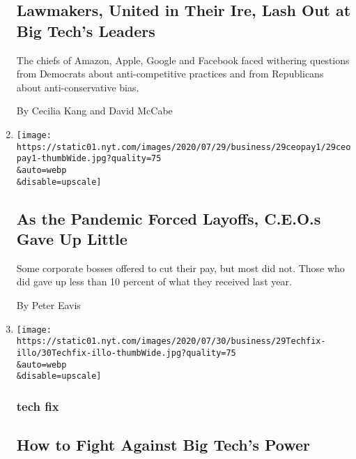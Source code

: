 \begin{enumerate}
  \hypertarget{lawmakers-united-in-their-ire-lash-out-at-big-techs-leaders}{%
  \subsection{Lawmakers, United in Their Ire, Lash Out at Big Tech's
  Leaders}\label{lawmakers-united-in-their-ire-lash-out-at-big-techs-leaders}}

  The chiefs of Amazon, Apple, Google and Facebook faced withering
  questions from Democrats about anti-competitive practices and from
  Republicans about anti-conservative bias.

  By Cecilia Kang and David McCabe
\item
  \href{/2020/07/29/business/economy/ceo-pay-pandemic-layoffs.html}{}

  \texttt{[image: https://static01.nyt.com/images/2020/07/29/business/29ceopay1/29ceopay1-thumbWide.jpg?quality=75\\\&auto=webp\\\&disable=upscale]}

  \hypertarget{as-the-pandemic-forced-layoffs-ceos-gave-up-little}{%
  \subsection{As the Pandemic Forced Layoffs, C.E.O.s Gave Up
  Little}\label{as-the-pandemic-forced-layoffs-ceos-gave-up-little}}

  Some corporate bosses offered to cut their pay, but most did not.
  Those who did gave up less than 10 percent of what they received last
  year.

  By Peter Eavis
\item
  \href{/2020/07/29/technology/personaltech/big-tech-power-how-to-fight.html}{}

  \texttt{[image: https://static01.nyt.com/images/2020/07/30/business/29Techfix-illo/30Techfix-illo-thumbWide.jpg?quality=75\\\&auto=webp\\\&disable=upscale]}

  \hypertarget{tech-fix}{%
  \subsubsection{tech fix}\label{tech-fix}}

  \hypertarget{how-to-fight-against-big-techs-power}{%
  \subsection{How to Fight Against Big Tech's
  Power}\label{how-to-fight-against-big-techs-power}}


\end{enumerate}

